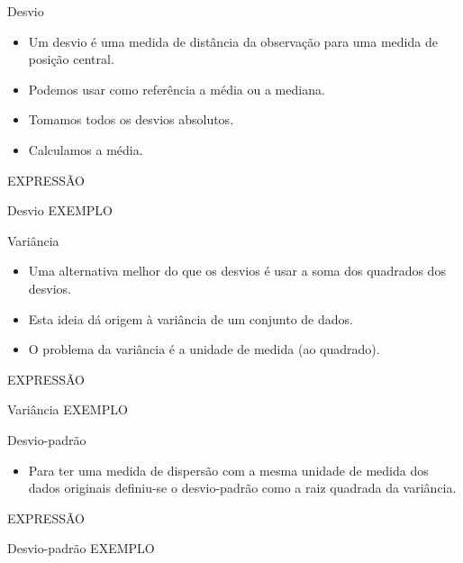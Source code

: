 \documentclass[
  ignorenonframetext,
  serif,
  professionalfont,
  usenames,
  dvipsnames,
  aspectratio = 169]{beamer}
\providecommand{\tightlist}{%
  \setlength{\itemsep}{0pt}\setlength{\parskip}{0pt}}
\renewcommand{\tightlist}{%
  \setlength{\itemsep}{0\baselineskip}
  \setlength{\parskip}{0.25\baselineskip}
}
\begin{document}
\begin{frame}{Desvio}
\protect\hypertarget{desvio}{}
\begin{itemize}
\tightlist
\item
  Um desvio é uma medida de distância da observação para uma medida de
  posição central.
\item
  Podemos usar como referência a média ou a mediana.
\item
  Tomamos todos os desvios absolutos.
\item
  Calculamos a média.
\end{itemize}

EXPRESSÃO
\end{frame}

\begin{frame}{Desvio}
\protect\hypertarget{desvio-1}{}
EXEMPLO
\end{frame}

\begin{frame}{Variância}
\protect\hypertarget{variuxe2ncia}{}
\begin{itemize}
\tightlist
\item
  Uma alternativa melhor do que os desvios é usar a soma dos quadrados
  dos desvios.
\item
  Esta ideia dá origem à variância de um conjunto de dados.
\item
  O problema da variância é a unidade de medida (ao quadrado).
\end{itemize}

EXPRESSÃO
\end{frame}

\begin{frame}{Variância}
\protect\hypertarget{variuxe2ncia-1}{}
EXEMPLO
\end{frame}

\begin{frame}{Desvio-padrão}
\protect\hypertarget{desvio-padruxe3o}{}
\begin{itemize}
\tightlist
\item
  Para ter uma medida de dispersão com a mesma unidade de medida dos
  dados originais definiu-se o desvio-padrão como a raiz quadrada da
  variância.
\end{itemize}

EXPRESSÃO
\end{frame}

\begin{frame}{Desvio-padrão}
\protect\hypertarget{desvio-padruxe3o-1}{}
EXEMPLO
\end{frame}
\end{document}
